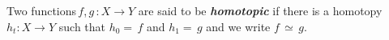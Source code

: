 \documentclass[preview]{standalone}
\begin{document}
\begin{center}
Two functions$\,f$,$\,g$$\,: X\to Y$ are said to be \textbf{\textit{homotopic}} if there is a homotopy $h_t : X\to Y$ such that $h_0=$$\,f$ and $h_1=$$\,g$ and we write $f$\,$\simeq$\,$g$.
\end{center}
\end{document}
